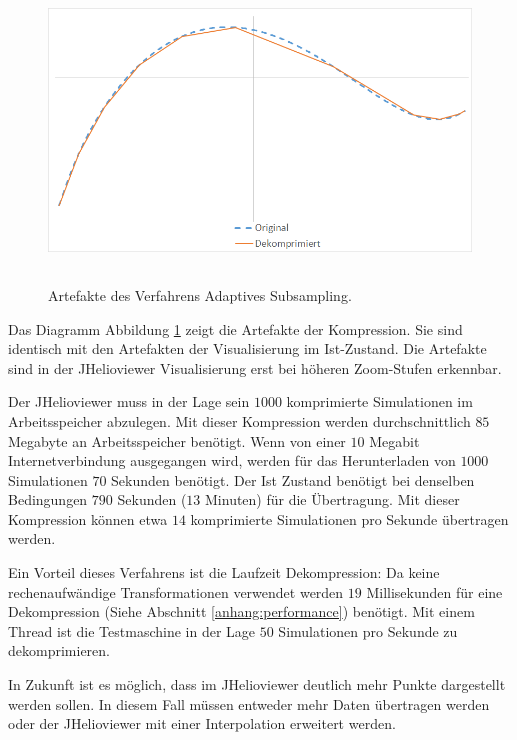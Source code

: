\begin{figure}[!htbp]
	\center
	\includegraphics[width=1\textwidth,height=8cm,keepaspectratio]{./pictures/resultate/loesung0/loesung0_artefakte.png}
	\caption{Artefakte des Verfahrens Adaptives Subsampling.}
	\label{resultate:loesung0:artefakte}
\end{figure}
Das Diagramm Abbildung \ref{resultate:loesung0:artefakte} zeigt die Artefakte der Kompression. Sie sind identisch mit den Artefakten der Visualisierung im Ist-Zustand. Die Artefakte sind in der JHelioviewer Visualisierung erst bei höheren Zoom-Stufen erkennbar.

Der JHelioviewer muss in der Lage sein $1000$ komprimierte Simulationen im Arbeitsspeicher abzulegen. Mit dieser Kompression werden durchschnittlich $85$ Megabyte an Arbeitsspeicher benötigt. Wenn von einer $10$ Megabit Internetverbindung ausgegangen wird, werden für das Herunterladen von $1000$ Simulationen $70$ Sekunden benötigt. Der Ist Zustand benötigt bei denselben Bedingungen $790$ Sekunden ($13$ Minuten) für die Übertragung. Mit dieser Kompression können etwa $14$ komprimierte Simulationen pro Sekunde übertragen werden. 

Ein Vorteil dieses Verfahrens ist die Laufzeit Dekompression: Da keine rechenaufwändige Transformationen verwendet werden $19$ Millisekunden für eine Dekompression (Siehe Abschnitt \ref{anhang:performance}) benötigt. Mit einem Thread ist die Testmaschine in der Lage $50$ Simulationen pro Sekunde zu dekomprimieren.

In Zukunft ist es möglich, dass im JHelioviewer deutlich mehr Punkte dargestellt werden sollen. In diesem Fall müssen entweder mehr Daten übertragen werden oder der JHelioviewer mit einer Interpolation erweitert werden.